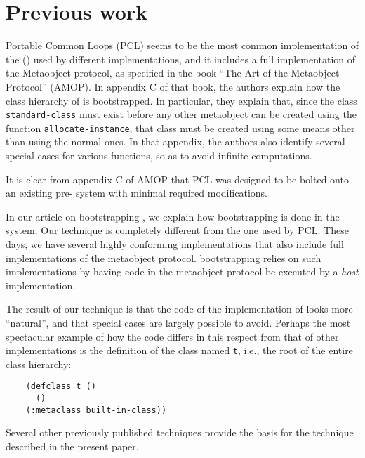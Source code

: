 \section{Previous work}

Portable Common Loops (PCL) seems to be the most common implementation
of the \closs{} (\clos{}) used by different \commonlisp{}
implementations, and it includes a full implementation of the \clos{}
Metaobject protocol, as specified in the book ``The Art of the
Metaobject Protocol'' \cite{Kiczales:1991:AMP:574212} (AMOP).  In
appendix C of that book, the authors explain how the class hierarchy
of \clos{} is bootstrapped.  In particular, they explain that, since
the class \texttt{standard-class} must exist before any other
metaobject can be created using the function
\texttt{allocate-instance}, that class must be created using some
means other than using the normal ones.  In that appendix, the authors
also identify several special cases for various functions, so as to
avoid infinite computations.

It is clear from appendix C of AMOP that PCL was designed to be bolted
onto an existing pre-\clos{} \commonlisp{} system with minimal
required modifications.

In our article on bootstrapping
\cite{Durand-Strandh:2019:ELS:Bootstrapping}, we explain how
bootstrapping is done in the \sicl{} system.  Our technique is
completely different from the one used by PCL.  These days, we have
several highly conforming \commonlisp{} implementations that also
include full implementations of the metaobject protocol.  \sicl{}
bootstrapping relies on such implementations by having code in the
metaobject protocol be executed by a \emph{host} implementation.

The result of our technique is that the code of the \sicl{}
implementation of \clos{} looks more ``natural'', and that special
cases are largely possible to avoid.  Perhaps the most spectacular
example of how the \sicl{} \clos{} code differs in this respect from
that of other \commonlisp{} implementations is the definition of the
class named \texttt{t}, i.e., the root of the entire \clos{} class
hierarchy:

\begin{verbatim}
    (defclass t ()
      ()
    (:metaclass built-in-class))
\end{verbatim}

Several other previously published techniques provide the basis for
the technique described in the present paper.


